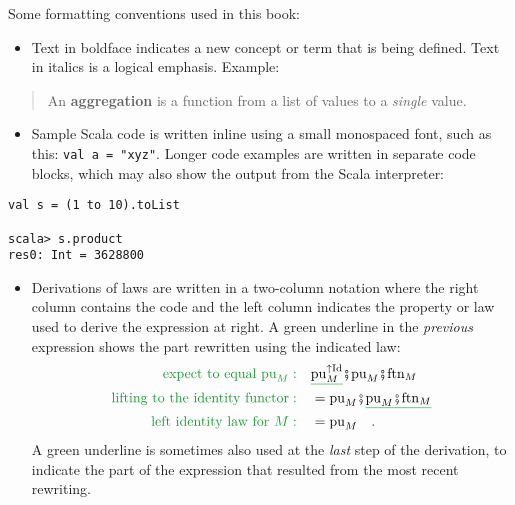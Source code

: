 Some formatting conventions used in this book:
\begin{itemize}
\item Text in boldface indicates a new concept or term that is being defined.
Text in italics is a logical emphasis. Example:
\end{itemize}
\begin{quotation}
An \textbf{aggregation} is a function from a list
of values to a \emph{single} value.
\end{quotation}
\begin{itemize}
\item Sample Scala code is written inline using a small monospaced font,
such as this: \lstinline!val a = "xyz"!.
Longer code examples are written in separate code blocks, which may
also show the output from the Scala interpreter:
\end{itemize}
\begin{lstlisting}
val s = (1 to 10).toList

scala> s.product
res0: Int = 3628800 
\end{lstlisting}
\begin{itemize}
\item Derivations of laws are written in a two-column notation where the
right column contains the code and the left column indicates the property
or law used to derive the expression at right. A green underline in
the \emph{previous} expression shows the part rewritten using the
indicated law:
\begin{align*}
{\color{greenunder}\text{expect to equal }\text{pu}_{M}:}\quad & \gunderline{\text{pu}_{M}^{\uparrow\text{Id}}}\bef\text{pu}_{M}\bef\text{ftn}_{M}\\
{\color{greenunder}\text{lifting to the identity functor}:}\quad & =\text{pu}_{M}\bef\gunderline{\text{pu}_{M}\bef\text{ftn}_{M}}\\
{\color{greenunder}\text{left identity law for }M:}\quad & =\text{pu}_{M}\quad.
\end{align*}
A green underline is sometimes also used at the \emph{last} step of
the derivation, to indicate the part of the expression that resulted
from the most recent rewriting.
\end{itemize}

